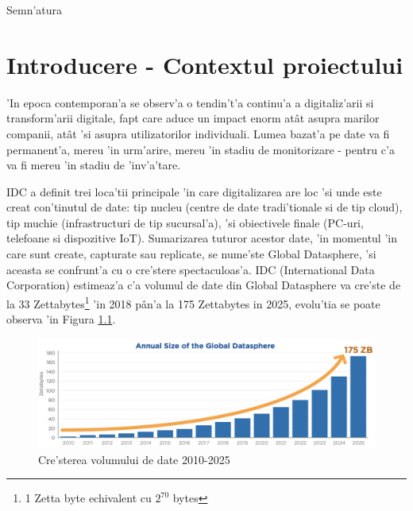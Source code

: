 \documentclass[12pt,a4paper,twoside]{report}
\begin{document}
\vspace{1cm}
\hspace{9.4cm}Semn'atura

\thispagestyle{empty}

\newpage




 

\newpage
{}
\setcounter{page}{1}
\tableofcontents
\newpage



\chapter{Introducere - Contextul proiectului}
\pagestyle{headings}
'In epoca contemporan'a se observ'a o tendin't'a continu'a a digitaliz'arii si transform'arii digitale, fapt care aduce un impact enorm atât asupra marilor companii, atât 'si asupra utilizatorilor individuali. Lumea bazat'a pe date va fi permanent'a, mereu 'in urm'arire, mereu 'in stadiu de monitorizare - pentru c'a va fi mereu 'in stadiu de 'inv'a'tare.

IDC\cite{IDCdigitization}  a definit trei loca'tii principale 'in care digitalizarea are loc 'si unde este creat con'tinutul de date: tip nucleu (centre de date tradi'tionale si de tip cloud), tip muchie (infrastructuri de tip sucursal'a), 'si obiectivele finale (PC-uri, telefoane si dispozitive IoT). Sumarizarea tuturor acestor date, 'in momentul 'in care sunt  create, capturate sau replicate, se nume'ste Global Datasphere, 'si aceasta se confrunt'a cu o cre'stere spectaculoas'a. IDC (International Data Corporation) estimeaz'a c'a volumul de date din Global Datasphere va cre'ste de la 33 Zettabytes\footnote{1 Zetta byte echivalent cu $2^{70}$ bytes} 'in 2018 pân'a la 175 Zettabytes in 2025, evolu'tia se poate observa 'in Figura \ref{data_grow}.

\begin{figure}[H]
\begin{center}
\advance\leftskip-3cm
\advance\rightskip-3cm
\includegraphics[keepaspectratio=true,scale=0.55]{img/data_grow.png}
\caption{Cre'sterea volumului de date 2010-2025}
\label{data_grow}
\end{center}
\end{figure}
\end{document}
